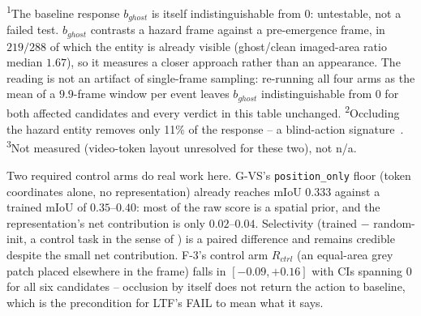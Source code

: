 \begin{table}[t]
\centering
\caption{G-VS / F-3: v1 primary readouts, six candidates, no grouping.}
\label{tab:main-matrix-v1}
\scriptsize
{}

\vspace{4pt}
{\scriptsize\textsuperscript{1}The baseline response $b_{ghost}$ is itself indistinguishable from 0: untestable, not a failed test. $b_{ghost}$ contrasts a hazard frame against a pre-emergence frame, in $219/288$ of which the entity is already visible (ghost/clean imaged-area ratio median $1.67$), so it measures a closer approach rather than an appearance. The reading is not an artifact of single-frame sampling: re-running all four arms as the mean of a $9.9$-frame window per event leaves $b_{ghost}$ indistinguishable from 0 for both affected candidates and every verdict in this table unchanged. \textsuperscript{2}Occluding the hazard entity removes only 11\% of the response -- a blind-action signature~\cite{embodiedinterp2026}. \textsuperscript{3}Not measured (video-token layout unresolved for these two), not n/a.}
\end{table}

Two required control arms do real work here. G-VS's \texttt{position\_only} floor (token
coordinates alone, no representation) already reaches mIoU $0.333$ against a trained mIoU of
$0.35$--$0.40$: most of the raw score is a spatial prior, and the representation's net
contribution is only $0.02$--$0.04$. Selectivity (trained $-$ random-init, a control task in
the sense of \citet{hewitt2019designing}) is a paired difference and remains credible despite
the small net contribution. F-3's control arm $R_{ctrl}$ (an equal-area grey patch placed
elsewhere in the frame) falls in $[-0.09,+0.16]$ with CIs spanning 0 for all six candidates --
occlusion by itself does not return the action to baseline, which is the precondition for
LTF's FAIL to mean what it says.

